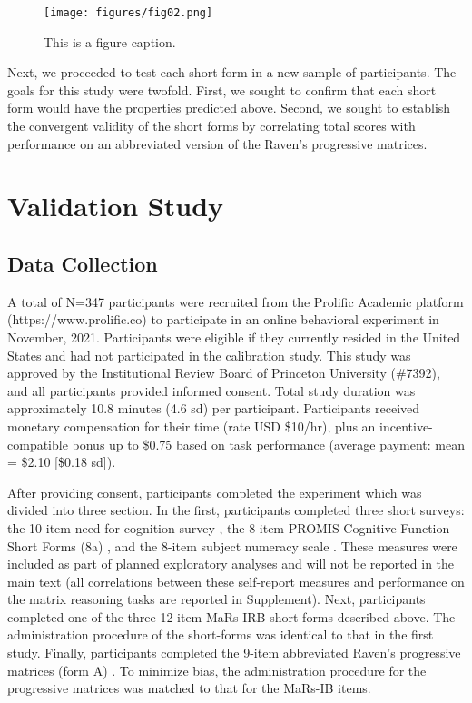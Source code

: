 \documentclass[a4paper,man,natbib]{apa6}
\begin{document}
\begin{figure}
\centering
\texttt{[image: figures/fig02.png]}
\caption{\label{fig:fig02}This is a figure caption.}
\end{figure}

Next, we proceeded to test each short form in a new sample of participants. The goals for this study were twofold. First, we sought to confirm that each short form would have the properties predicted above. Second, we sought to establish the convergent validity of the short forms by correlating total scores with performance on an abbreviated version of the Raven's progressive matrices.

\section{Validation Study}

\subsection{Data Collection}

A total of N=347 participants were recruited from the Prolific Academic platform (https://www.prolific.co) to participate in an online behavioral experiment in November, 2021. Participants were eligible if they currently resided in the United States and had not participated in the calibration study. This study was approved by the Institutional Review Board of Princeton University (\#7392), and all participants provided informed consent. Total study duration was approximately 10.8 minutes (4.6 sd) per participant. Participants received monetary compensation for their time (rate USD \$10/hr), plus an incentive-compatible bonus up to \$0.75 based on task performance (average payment: mean = \$2.10 [\$0.18 sd]). 

After providing consent, participants completed the experiment which was divided into three section. In the first, participants completed three short surveys: the 10-item need for cognition survey \citep{chiesi2018applying}, the 8-item PROMIS Cognitive Function-Short Forms (8a) \citep{iverson2021normative}, and the 8-item subject numeracy scale \citep{fagerlin2007measuring}. These measures were included as part of planned exploratory analyses and will not be reported in the main text (all correlations between these self-report measures and performance on the matrix reasoning tasks are reported in Supplement). Next, participants completed one of the three 12-item MaRs-IRB short-forms described above. The administration procedure of the short-forms was identical to that in the first study. Finally, participants completed the 9-item abbreviated Raven's progressive matrices (form A) \citep{bilker2012development}. To minimize bias, the administration procedure for the progressive matrices was matched to that for the MaRs-IB items.
\end{document}
